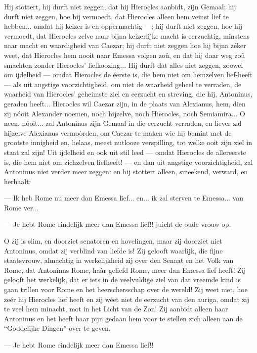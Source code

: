 \documentclass[a4paper, 12pt, oneside, dutch]{article}
\begin{document}
Hij stottert, hij durft niet zeggen, dat hij Hierocles aanbidt, zijn Gemaal; hij durft niet zeggen, hoe hij vermoedt, dat Hierocles alleen hem veinst lief te hebben... omdat hij keizer is en oppermachtig ---; hij durft niet zeggen, hoe hij vermoedt, dat Hierocles zelve naar bijna keizerlijke macht is eerzuchtig, minstens naar macht en waardigheid van Caezar; hij durft niet zeggen hoe hij bijna zéker weet, dat Hierocles hem nooit naar Emessa volgen zoû, en dat hij daar weg zoû smachten zonder Hierocles' liefkoozing... Hij durft dat alles niet zeggen, zoowel om ijdelheid --- omdat Hierocles de éerste is, die hem niet om hemzelven lief-heeft --- als uit angstige voorzichtigheid, om niet de waarheid geheel te verraden, de waarheid van Hierocles' geheimste ziel en eerzucht en streving, die hij, Antoninus, geraden heeft... Hierocles wil Caezar zijn, in de plaats van Alexianus, hem, dien zij nóoit Alexander noemen, noch hijzelve, noch Hierocles, noch Semiamira... O neen, nóoit... zal Antoninus zijn Gemaal in die eerzucht verraden, en liever zal hijzelve Alexianus vermoòrden, om Caezar te maken wie hij bemint met de grootste innigheid en, helaas, meest nutlooze verspilling, tot welke ooit zijn ziel in staat zal zijn! Uit ijdelheid en ook uit stil leed --- omdat Hierocles de allereerste is, die hem niet om zichzelven liefheeft! --- en dan uit angstige voorzichtigheid, zal Antoninus niet verder meer zeggen: en hij stottert alleen, smeekend, verward, en herhaalt:

--- Ik heb Rome nu meer dan Emessa lief... en... ik zal sterven te Emessa... van Rome ver...

--- Je hebt Rome eindelijk meer dan Emessa lief!! juicht de oude vrouw op.

O zij is slim, en doorziet senatoren en hovelingen, maar zij doorziet niet Antoninus, omdat zij verblind van liefde is! Zij gelooft waarlijk, die fijne staatsvrouw, almachtig in werkelijkheid zij over den Senaat en het Volk van Rome, dat Antoninus Rome, haàr geliefd Rome, meer dan Emessa lief heeft! Zij gelooft het werkelijk, dat er iets in de veelvuldige ziel van dat vreemde kind is gaan trillen voor Rome en het heerschersschap over de wereld! Zij weet niet, hoe zeér hij Hierocles lief heeft en zij wéet niet de eerzucht van den auriga, omdat zij te veel hem minacht, mot in het Licht van de Zon! Zij aanbidt alleen haar Antoninus en het heeft haar pijn gedaan hem voor te stellen zich alleen aan de "`Goddelijke Dingen"' over te geven.

--- Je hebt Rome eindelijk meer dan Emessa lief!!
\end{document}
